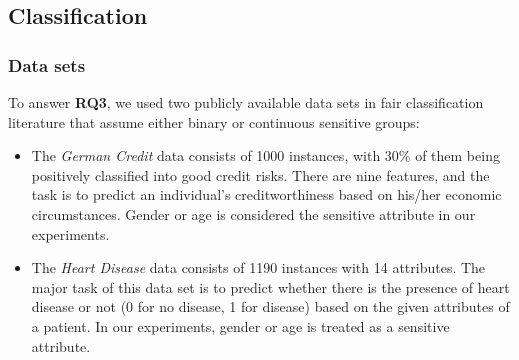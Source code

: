 \subsection{Classification}
\subsubsection{Data sets}
To answer \textbf{RQ3}, we used two publicly available data sets in fair classification literature that assume either binary or continuous sensitive groups:
\begin{itemize}
    \item The \emph{German Credit} \cite{german} data consists of 1000 instances, with 30\% of them being positively classified into good credit risks. There are nine features, and the task is to predict an individual's creditworthiness based on his/her economic circumstances. Gender or age is considered the sensitive attribute in our experiments.
    \item The \emph{Heart Disease} \cite{german} data consists of 1190 instances with 14 attributes. The major task of this data set is to predict whether there is the presence of heart disease or not (0 for no disease, 1 for disease) based on the given attributes of a patient. In our experiments, gender or age is treated as a sensitive attribute.
\end{itemize}

